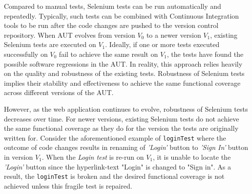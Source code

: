 
  

Compared to manual tests, Selenium tests can be run automatically and repeatedly. Typically, such tests can be combined with Continuous Integration tools to be run after the code changes are pushed to the version control repository. When AUT evolves from version $V_{0}$ to a newer version $V_{1}$, existing Selenium tests are executed on $V_{1}$. Ideally, if one or more tests executed successfully on $V_{0}$ fail to achieve the same result on $V_{1}$, the tests have found the possible software regressions in the AUT. In reality, this approach relies heavily on the quality and robustness of the existing tests. Robustness of Selenium tests implies their stability and effectiveness to achieve the same functional coverage across different versions of the AUT. 

However, as the web application continues to evolve, robustness of Selenium tests decreases over time. For newer versions, existing Selenium tests do not achieve the same functional coverage as they do for the version the tests are originally written for. Consider the aforementioned example of \texttt{loginTest} where the outcome of code changes results in renaming of \textit{'Login'} button to \textit{'Sign In'} button in version $V_{1}$. When the \textit{Login test} is re-run on $V_{1}$, it is unable to locate the \textit{'Login'} button since the hyperlink-text "Login" is changed to "Sign in". As a result, the \texttt{loginTest} is broken and the desired functional coverage is not achieved unless this fragile test is repaired. 

